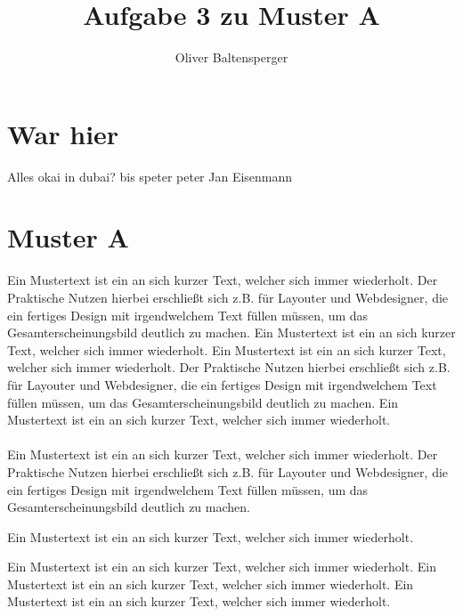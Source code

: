 \documentclass{article}
\title{Aufgabe 3 zu Muster A}
\author{Oliver Baltensperger}
\begin{document}
\maketitle

\section{War hier}
Alles okai in dubai?
bis speter peter
Jan Eisenmann
\section{Muster A}
Ein Mustertext ist ein an sich kurzer Text, welcher sich immer wiederholt. Der Praktische Nutzen hierbei erschließt sich z.B. für Layouter und Webdesigner, die ein fertiges Design mit irgendwelchem Text füllen müssen, um das Gesamterscheinungsbild deutlich zu machen. Ein Mustertext ist ein an sich kurzer Text, welcher sich immer wiederholt. Ein Mustertext ist ein an sich kurzer Text, welcher sich immer wiederholt. Der Praktische Nutzen hierbei erschließt sich z.B. für Layouter und Webdesigner, die ein fertiges Design mit irgendwelchem Text füllen müssen, um das
Gesamterscheinungsbild deutlich zu machen. Ein Mustertext ist ein an sich kurzer Text, welcher sich immer wiederholt.\citep{meusel2005entwicklung} \\
\\
Ein Mustertext ist ein an sich kurzer Text, welcher sich immer wiederholt. Der Praktische Nutzen hierbei erschließt sich z.B. für Layouter und Webdesigner, die ein fertiges Design mit irgendwelchem Text füllen müssen, um das Gesamterscheinungsbild deutlich zu machen.  \citep{hawking1993brief}

\begin{center}
Ein Mustertext ist ein an sich kurzer Text, welcher sich immer wiederholt. 
\end{center}

Ein Mustertext ist ein an sich kurzer Text, welcher sich immer wiederholt. Ein Mustertext ist ein an sich kurzer Text, welcher sich immer wiederholt. Ein Mustertext ist ein an sich kurzer Text, welcher sich immer wiederholt.\citep{nicolaou2013aufkommen} 


{}
\end{document}
